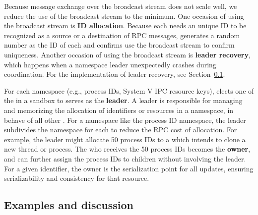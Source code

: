 Because message exchange over the broadcast stream does not scale well,
we reduce the use of the broadcast stream to the minimum.
One occasion of using the broadcast stream is
{\bf \picoproc{} ID allocation}.
Because each \picoproc{} needs an unique ID to be recognized as a source or a destination of RPC messages, \thelibos{} generates a random number as the ID of each \picoproc{} and confirms use the broadcast stream to confirm uniqueness.
Another occasion of using the broadcast stream
is {\bf leader recovery}, which happens when a namespace leader unexpectedly crashes
during coordination. For the implementation of leader recovery, see Section~\ref{sec:libos:namespaces:details}.


For each namespace (e.g., process IDs, System V IPC resource keys), \thelibos{} elects one of the \picoprocs{} in a sandbox to serves as the {\bf leader}.
A leader is responsible for
managing and memorizing the allocation of identifiers or resources in a namespace,
in behave of all other \picoprocs{}.
For a namespace like the process ID namespace,
the leader subdivides the namespace for each \picoproc{} to reduce the RPC cost of allocation.
For example, the leader might allocate 50 process IDs to a \picoproc{} which intends to clone a new thread or process.
The \picoproc{} who receives the 50 process IDs becomes the {\bf owner},
and can further assign the process IDs
to children without involving the leader.
For a given identifier, the owner is the serialization point for all updates,
ensuring serializability and consistency for that resource.

\subsection{Examples and discussion}
\label{sec:libos:namespaces:details}

